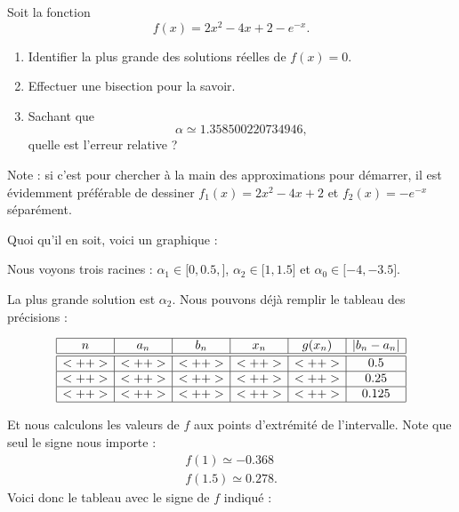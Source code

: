 \begin{example}

	Soit la fonction
	\begin{equation}
		f(x)=2x^2-4x+2-e^{-x}.
	\end{equation}

	\begin{enumerate}
		\item
		      Identifier la plus grande des solutions réelles de \( f(x)=0\).
		\item
		      Effectuer une bisection pour la savoir.
		\item
		      Sachant que
		      \begin{equation}
			      \alpha\simeq 1.358500220734946,
		      \end{equation}
		      quelle est l'erreur relative ?
	\end{enumerate}

	Note : si c'est pour chercher à la main des approximations pour démarrer, il est évidemment préférable de dessiner \( f_1(x)=2x^2-4x+2\) et \( f_2(x)=- e^{-x}\) séparément.

	Quoi qu'il en soit, voici un graphique :

	\begin{center}
		
	\end{center}

	Nous voyons trois racines : \( \alpha_1\in\mathopen[ 0,0.5 ,  \mathclose]\), \( \alpha_2\in\mathopen[ 1, 1.5 \mathclose]\) et \( \alpha_0\in\mathopen[ -4 , -3.5 \mathclose]\).

	La plus grande solution est \( \alpha_2\). Nous pouvons déjà remplir le tableau des précisions :

	\begin{equation*}
		\begin{array}[]{|c|c|c|c|c|c|}
			\hline
			n    & a_n  & b_n  & x_n  & g(x_n) & | b_n-a_n | \\
			\hline\hline
			<++> & <++> & <++> & <++> & <++>   & 0.5         \\
			\hline
			<++> & <++> & <++> & <++> & <++>   & 0.25        \\
			\hline
			<++> & <++> & <++> & <++> & <++>   & 0.125       \\
			\hline
		\end{array}
	\end{equation*}

	Et nous calculons les valeurs de \( f\) aux points d'extrémité de l'intervalle. Note que seul le signe nous importe :
	\begin{subequations}
		\begin{align}
			f(1)\simeq -0.368 \\
			f(1.5)\simeq 0.278.
		\end{align}
	\end{subequations}
	Voici donc le tableau avec le signe de \( f\) indiqué :


\end{example}
